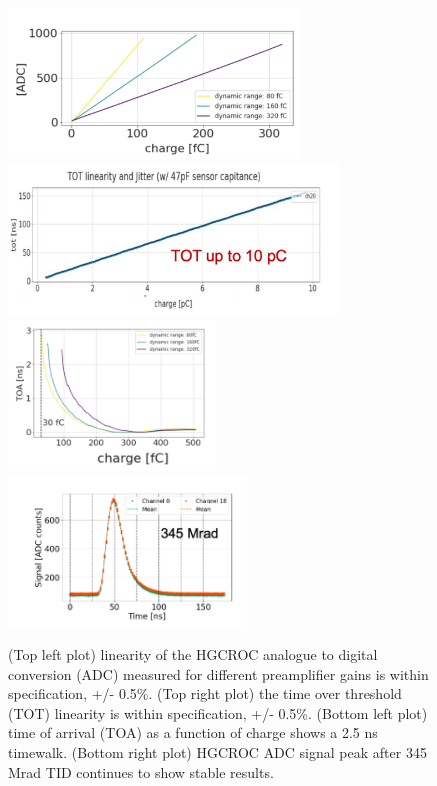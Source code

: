 \documentclass[twocolumn]{webofc}
\begin{document}
\begin{figure}[ht]
\centering
\includegraphics[height=4cm]{figures/roc-ADClinearity.png}
\includegraphics[height=4cm]{figures/roc-TOTlinearity.png}\\
\includegraphics[height=4cm]{figures/roc-toaTimewalk.png}
\includegraphics[height=4cm]{figures/roc-ADCirradiation.png}
\caption{(Top left plot) linearity of the HGCROC analogue to digital conversion (ADC) measured for different preamplifier gains is within specification, +/- 0.5\%. (Top right plot) the time over threshold (TOT) linearity is within specification, +/- 0.5\%. (Bottom left plot) time of arrival (TOA) as a function of charge shows a 2.5 ns timewalk. (Bottom right plot) HGCROC ADC signal peak after 345 Mrad TID continues to show stable results.}
\label{fig:roc}
\end{figure}
\end{document}
